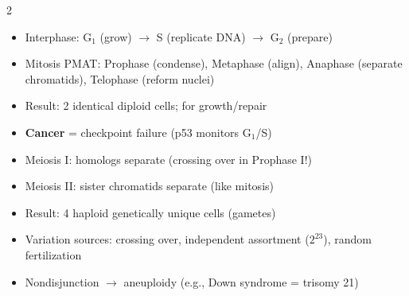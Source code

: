 \documentclass[11pt, letterpaper]{article}
\begin{document}
\begin{tcolorbox}[colback=part5bg, colframe=sectionteal,
  title={\bfseries Cell Cycle, Mitosis \& Meiosis}, arc=3pt, boxrule=1pt]
\footnotesize
\begin{multicols}{2}
\begin{itemize}[noitemsep, leftmargin=*]
  \item Interphase: G$_1$ (grow) $\to$ S (replicate DNA) $\to$ G$_2$ (prepare)
  \item Mitosis PMAT: Prophase (condense), Metaphase (align), Anaphase (separate chromatids), Telophase (reform nuclei)
  \item Result: 2 identical diploid cells; for growth/repair
  \item \textbf{Cancer} = checkpoint failure (p53 monitors G$_1$/S)
\end{itemize}
\columnbreak
\begin{itemize}[noitemsep, leftmargin=*]
  \item Meiosis I: homologs separate (crossing over in Prophase I!)
  \item Meiosis II: sister chromatids separate (like mitosis)
  \item Result: 4 haploid genetically unique cells (gametes)
  \item Variation sources: crossing over, independent assortment ($2^{23}$), random fertilization
  \item Nondisjunction $\to$ aneuploidy (e.g., Down syndrome = trisomy 21)
\end{itemize}
\end{multicols}
\end{tcolorbox}

\vspace{4pt}
\end{document}
